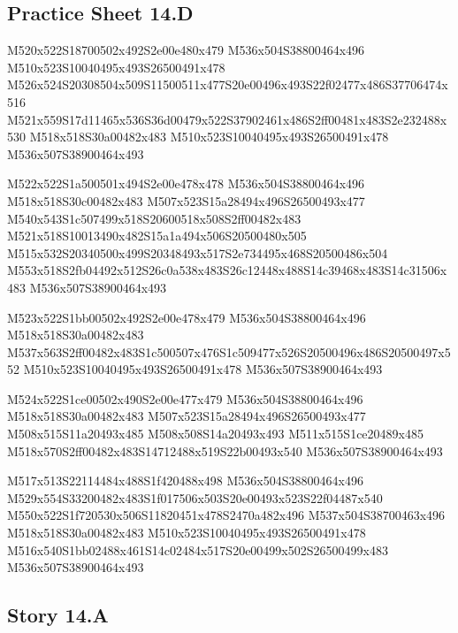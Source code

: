 \documentclass{article}
\begin{document}
\subsection{Practice Sheet 14.D}

\begin{multicols}{5}
\begin{center}

M520x522S18700502x492S2e00e480x479 %
M536x504S38800464x496 %
M510x523S10040495x493S26500491x478 %
M526x524S20308504x509S11500511x477S20e00496x493S22f02477x486S37706474x516 %
M521x559S17d11465x536S36d00479x522S37902461x486S2ff00481x483S2e232488x530 %
M518x518S30a00482x483 %
M510x523S10040495x493S26500491x478 %
M536x507S38900464x493 %
\vfil
\columnbreak

M522x522S1a500501x494S2e00e478x478 %
M536x504S38800464x496 %
M518x518S30c00482x483 %
M507x523S15a28494x496S26500493x477 %
M540x543S1c507499x518S20600518x508S2ff00482x483 %
M521x518S10013490x482S15a1a494x506S20500480x505 %
M515x532S20340500x499S20348493x517S2e734495x468S20500486x504 %
M553x518S2fb04492x512S26c0a538x483S26c12448x488S14c39468x483S14c31506x483 %
M536x507S38900464x493 %
\vfil
\columnbreak

M523x522S1bb00502x492S2e00e478x479 %
M536x504S38800464x496 %
M518x518S30a00482x483 %
M537x563S2ff00482x483S1c500507x476S1c509477x526S20500496x486S20500497x552 %
M510x523S10040495x493S26500491x478 %
M536x507S38900464x493 %
\vfil
\columnbreak

M524x522S1ce00502x490S2e00e477x479 %
M536x504S38800464x496 %
M518x518S30a00482x483 %
M507x523S15a28494x496S26500493x477 %
M508x515S11a20493x485 %
M508x508S14a20493x493 %
M511x515S1ce20489x485 %
M518x570S2ff00482x483S14712488x519S22b00493x540 %
M536x507S38900464x493 %
\vfil
\columnbreak

M517x513S22114484x488S1f420488x498 %
M536x504S38800464x496 %
M529x554S33200482x483S1f017506x503S20e00493x523S22f04487x540 %
M550x522S1f720530x506S11820451x478S2470a482x496 %
M537x504S38700463x496 %
M518x518S30a00482x483 %
M510x523S10040495x493S26500491x478 %
M516x540S1bb02488x461S14c02484x517S20e00499x502S26500499x483 %
M536x507S38900464x493 %
\vfil

\end{center}
\end{multicols}

\subsection{Story 14.A}
\end{document}

